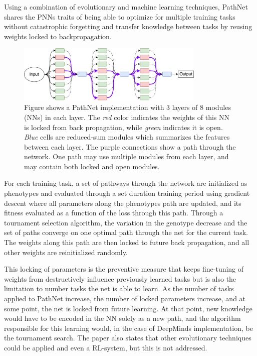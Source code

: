 Using a combination of evolutionary and machine learning techniques, PathNet shares the PNNs traits of being able to optimize for multiple training tasks without catastrophic forgetting and transfer knowledge between tasks by reusing weights locked to backpropagation.  
\begin{figure}[h]
    \centering
    \includegraphics[width=0.8\textwidth]{Chapters/Background/figures/PathNet.pdf}
    \caption{Figure shows a PathNet implementation with 3 layers of 8 modules (NNs) in each layer. The \textit{red} color indicates the weights of this NN is locked from back propagation, while \textit{green} indicates it is open. \textit{Blue} cells are reduced-sum modules which summarizes the features between each layer. The purple connections show a path through the network. One path may use multiple modules from each layer, and may contain both locked and open modules.}
    \label{fig:pathnet}
\end{figure}
For each training task, a set of pathways through the network are initialized as phenotypes and evaluated through a set duration training period using gradient descent where all parameters along the phenotypes path are updated, and its fitness evaluated as a function of the loss through this path. Through a tournament selection algorithm, the variation in the genotype decrease and the set of paths converge on one optimal path through the net for the current task. The weights along this path are then locked to future back propagation, and all other weights are reinitialized randomly.

This locking of parameters is the preventive measure that keeps fine-tuning of weights from destructively influence previously learned tasks but is also the limitation to number tasks the net is able to learn. As the number of tasks applied to PathNet increase, the number of locked parameters increase, and at some point, the net is locked from future learning. At that point, new knowledge would have to be encoded in the NN solely as a new path, and the algorithm responsible for this learning would, in the case of DeepMinds implementation, be the tournament search. The paper also states that other evolutionary techniques could be applied and even a RL-system, but this is not addressed.

